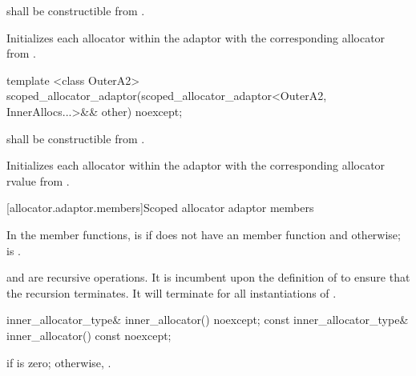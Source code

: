 \begin{itemdescr}
\pnum
\requires {} shall be constructible from .

\pnum
\effects Initializes each allocator within the adaptor with the corresponding allocator
from .
\end{itemdescr}

%
\begin{itemdecl}
template <class OuterA2>
  scoped_allocator_adaptor(scoped_allocator_adaptor<OuterA2,
                                                    InnerAllocs...>&& other) noexcept;
\end{itemdecl}

\begin{itemdescr}
\pnum
\requires {} shall be constructible from .

\pnum
\effects Initializes each allocator within the adaptor with the corresponding allocator rvalue
from .
\end{itemdescr}

[allocator.adaptor.members]{Scoped allocator adaptor members}

\pnum
In the  member functions,
 is  if  does not have an
 member function and
otherwise;
 is
.
\begin{note}  and
 are recursive operations. It
is incumbent upon the definition of  to ensure that the
recursion terminates. It will terminate for all instantiations of
. \end{note}

%
\begin{itemdecl}
inner_allocator_type& inner_allocator() noexcept;
const inner_allocator_type& inner_allocator() const noexcept;
\end{itemdecl}

\begin{itemdescr}
\pnum
\returns {} if  is zero; otherwise,
.
\end{itemdescr}

